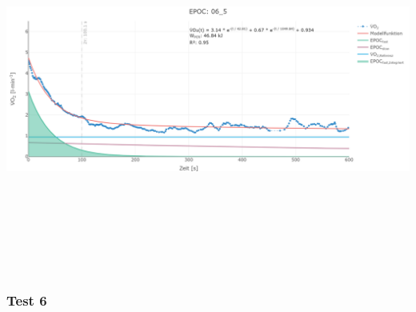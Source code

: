 \documentclass[
  letterpaper,
  DIV=11]{scrartcl}
\begin{document}
\includegraphics[width=11.45833in,height=4.6875in]{images/06_5.png}

\subsubsection{Test 6}
\end{document}
